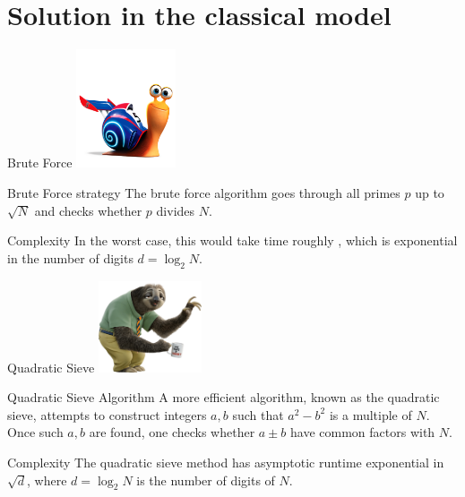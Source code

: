\documentclass{beamer}
\begin{document}
    \section{Solution in the classical model}
    \begin{frame}{Brute Force}
        \centering
        \includegraphics[height=3.5cm, keepaspectratio]{images/turbo.png}
        \begin{alertblock}{Brute Force strategy}
            The brute force algorithm goes through all primes $p$ up to $\sqrt{N}$ and checks whether $p$ divides $N$.
        \end{alertblock}
        \begin{exampleblock}{Complexity}
            In the worst case, this would take time roughly , which is exponential in the number of digits $d = \log_2N$.
        \end{exampleblock}
    \end{frame}
    \begin{frame}{Quadratic Sieve}
        \centering
        \includegraphics[height=2.7cm,keepaspectratio]{images/bradipo.png}
        \begin{alertblock}{Quadratic Sieve Algorithm}
            A more efficient algorithm, known as the quadratic sieve, attempts to construct integers $a,b$ such that $a^2-b^2$ is a multiple of $N$.
            Once such $a,b$ are found, one checks whether $a \pm b$ have common factors with $N$.
        \end{alertblock}
        \begin{exampleblock}{Complexity}
            The quadratic sieve method has asymptotic runtime exponential in $\sqrt{d}$, where $d = \log_2N$ is the number of digits of $N$.
        \end{exampleblock}
    \end{frame}
\end{document}
